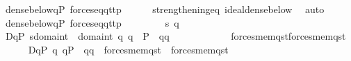 \begin{isabellebody}
\ {\isachardoublequoteopen}dense{\isacharunderscore}{\kern0pt}below{\isacharparenleft}{\kern0pt}{\isacharbraceleft}{\kern0pt}q{\isasymin}P{\isachardot}{\kern0pt}\ forces{\isacharunderscore}{\kern0pt}eq{\isacharparenleft}{\kern0pt}q{\isacharcomma}{\kern0pt}t{}{\isacharcomma}{\kern0pt}t{}{\isacharparenright}{\kern0pt}{\isacharbraceright}{\kern0pt}{\isacharcomma}{\kern0pt}p{\isacharparenright}{\kern0pt}{\isachardoublequoteclose}\isanewline
\ \ \ \ \isamarkupfalse%
\ strengthening{\isacharunderscore}{\kern0pt}eq\ ideal{\isacharunderscore}{\kern0pt}dense{\isacharunderscore}{\kern0pt}below\ \isamarkupfalse%
\ auto\isanewline
{}\isamarkupfalse%
\isanewline
\ \ \isamarkupfalse%
\ {\isachardoublequoteopen}dense{\isacharunderscore}{\kern0pt}below{\isacharparenleft}{\kern0pt}{\isacharbraceleft}{\kern0pt}q{\isasymin}P{\isachardot}{\kern0pt}\ forces{\isacharunderscore}{\kern0pt}eq{\isacharparenleft}{\kern0pt}q{\isacharcomma}{\kern0pt}t{}{\isacharcomma}{\kern0pt}t{}{\isacharparenright}{\kern0pt}{\isacharbraceright}{\kern0pt}{\isacharcomma}{\kern0pt}p{\isacharparenright}{\kern0pt}{\isachardoublequoteclose}\isanewline
\ \ \isacommand{{\isacharbraceleft}{\kern0pt}}\isamarkupfalse%
\isanewline
\ \ \ \ \isamarkupfalse%
\ s\ q\ \isanewline
\ \ \ \ \isamarkupfalse%
\ {\isacharquery}{\kern0pt}D{}{\isacharequal}{\kern0pt}{\isachardoublequoteopen}{\isacharbraceleft}{\kern0pt}q{\isacharprime}{\kern0pt}{\isasymin}P{\isachardot}{\kern0pt}\ {\isasymforall}s{\isasymin}domain{\isacharparenleft}{\kern0pt}t{}{\isacharparenright}{\kern0pt}\ {\isasymunion}\ domain{\isacharparenleft}{\kern0pt}t{}{\isacharparenright}{\kern0pt}{\isachardot}{\kern0pt}\ {\isasymforall}q{\isachardot}{\kern0pt}\ q\ {\isasymin}\ P\ {\isasymand}\ q{\isasympreceq}q{\isacharprime}{\kern0pt}\ {\isasymlongrightarrow}\isanewline
\ \ \ \ \ \ \ \ \ \ \ forces{\isacharunderscore}{\kern0pt}mem{\isacharparenleft}{\kern0pt}q{\isacharcomma}{\kern0pt}s{\isacharcomma}{\kern0pt}t{}{\isacharparenright}{\kern0pt}{\isasymlongleftrightarrow}forces{\isacharunderscore}{\kern0pt}mem{\isacharparenleft}{\kern0pt}q{\isacharcomma}{\kern0pt}s{\isacharcomma}{\kern0pt}t{}{\isacharparenright}{\kern0pt}{\isacharbraceright}{\kern0pt}{\isachardoublequoteclose}\isanewline
\ \ \ \ \isamarkupfalse%
\ {\isacharquery}{\kern0pt}D{}{\isacharequal}{\kern0pt}{\isachardoublequoteopen}{\isacharbraceleft}{\kern0pt}q{\isacharprime}{\kern0pt}{\isasymin}P{\isachardot}{\kern0pt}\ {\isasymforall}q{\isachardot}{\kern0pt}\ q{\isasymin}P\ {\isasymand}\ q{\isasympreceq}q{\isacharprime}{\kern0pt}\ {\isasymlongrightarrow}\ forces{\isacharunderscore}{\kern0pt}mem{\isacharparenleft}{\kern0pt}q{\isacharcomma}{\kern0pt}s{\isacharcomma}{\kern0pt}t{}{\isacharparenright}{\kern0pt}\ {\isasymlongleftrightarrow}\ forces{\isacharunderscore}{\kern0pt}mem{\isacharparenleft}{\kern0pt}q{\isacharcomma}{\kern0pt}s{\isacharcomma}{\kern0pt}t{}{\isacharparenright}{\kern0pt}{\isacharbraceright}{\kern0pt}{\isachardoublequoteclose}\isanewline

\end{isabellebody}
